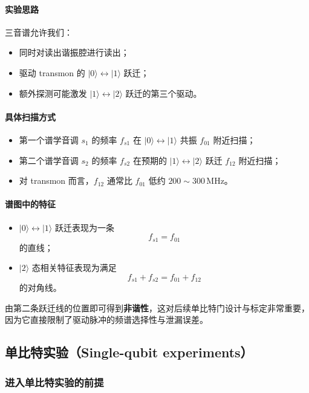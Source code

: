 \documentclass[12pt,a4paper,oneside]{ctexbook}
\begin{document}
\paragraph{实验思路}
三音谱允许我们：
\begin{itemize}
    \item 同时对读出谐振腔进行读出；
    \item 驱动 transmon 的 \(|0\rangle \leftrightarrow |1\rangle\) 跃迁；
    \item 额外探测可能激发 \(|1\rangle \leftrightarrow |2\rangle\) 跃迁的第三个驱动。
\end{itemize}

\paragraph{具体扫描方式}
\begin{itemize}
    \item 第一个谱学音调 \(s_1\) 的频率 \(f_{s1}\) 在 \(|0\rangle \leftrightarrow |1\rangle\) 共振 \(f_{01}\) 附近扫描；
    \item 第二个谱学音调 \(s_2\) 的频率 \(f_{s2}\) 在预期的 \(|1\rangle \leftrightarrow |2\rangle\) 跃迁 \(f_{12}\) 附近扫描；
    \item 对 transmon 而言，\(f_{12}\) 通常比 \(f_{01}\) 低约 \(200\sim 300\,\mathrm{MHz}\)。
\end{itemize}

\paragraph{谱图中的特征}
\begin{itemize}
    \item \(|0\rangle \leftrightarrow |1\rangle\) 跃迁表现为一条
    \[
    f_{s1}=f_{01}
    \]
    的直线；
    \item \(|2\rangle\) 态相关特征表现为满足
    \[
    f_{s1}+f_{s2}=f_{01}+f_{12}
    \]
    的对角线。
\end{itemize}

由第二条跃迁线的位置即可得到\textbf{非谐性}，这对后续单比特门设计与标定非常重要，因为它直接限制了驱动脉冲的频谱选择性与泄漏误差。

\subsection{单比特实验（Single-qubit experiments）}

\subsubsection{进入单比特实验的前提}
\end{document}
